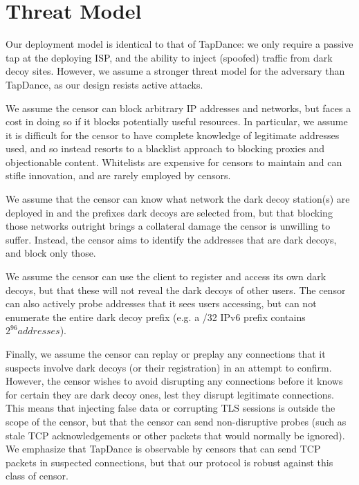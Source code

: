 \documentclass[letterpaper,twocolumn,10pt]{article}
\begin{document}
\section{Threat Model}


Our deployment model is identical to that of TapDance: we only require a passive
tap at the deploying ISP, and the ability to inject (spoofed) traffic from dark
decoy sites. However, we assume a stronger threat model for the adversary than
TapDance, as our design resists active attacks.


We assume the censor can block arbitrary IP addresses and networks, but faces a
cost in doing so if it blocks potentially useful resources. In particular, we
assume it is difficult for the censor to have complete knowledge of legitimate
addresses used, and so instead resorts to a blacklist approach to blocking
proxies and objectionable content.
Whitelists are expensive for censors to maintain and can stifle
innovation, and are rarely employed by censors.


We assume that the censor can know what network the dark decoy station(s) are
deployed in and the prefixes dark decoys are selected from, but that blocking those
networks outright brings a collateral
damage the censor is unwilling to suffer. Instead, the censor aims to identify
the addresses that are dark decoys, and block only those.

We assume the censor can use the client to register and access its own dark
decoys, but that these will not reveal the dark decoys of other users. The
censor can also actively probe addresses that it sees users accessing, but can
not enumerate the entire dark decoy prefix (e.g. a /32 IPv6 prefix contains
$2^{96} addresses$).

Finally, we assume the censor can replay or preplay any connections that it
suspects involve dark decoys (or their registration) in an attempt to confirm.
However, the censor wishes to avoid disrupting any connections before it
knows for certain they are dark decoy ones, lest they disrupt legitimate
connections. This means that injecting false data or corrupting TLS sessions is
outside the scope of the censor, but that the censor can send non-disruptive
probes (such as stale TCP acknowledgements or other packets that would normally
be ignored). We emphasize that TapDance is observable by censors that can send
TCP packets in suspected connections, but that our protocol is robust against
this class of censor.

\end{document}
